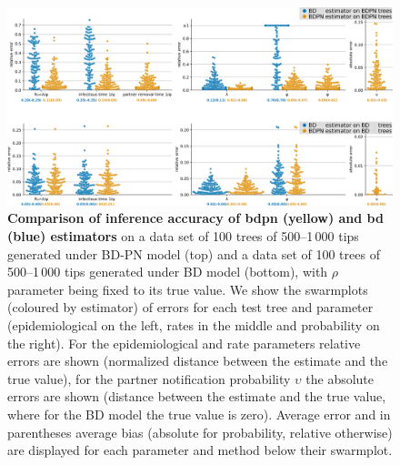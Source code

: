 \documentclass[10pt,letterpaper]{article}
\begin{document}
\begin{figure}[h!]
\begin{adjustwidth}{-1in}{0in}
\centering 
\includegraphics[width=1.2\textwidth]{Fig_errors_p.png}
\end{adjustwidth}
\caption{\textbf{Comparison of inference accuracy of bdpn (yellow) and bd (blue) estimators} on a data set of 100 trees of 500--1\,000 tips generated under BD-PN model (top) and a data set of 100 trees of 500--1\,000 tips generated under BD model (bottom), with $\rho$ parameter being fixed to its true value.
We show the swarmplots (coloured by estimator) of errors for each test tree and parameter (epidemiological on the left, rates in the middle and probability on the right). For the epidemiological and rate parameters relative errors are shown (normalized distance between the estimate and the true value), for the partner notification probability $\upsilon$ the absolute errors are shown (distance between the estimate and the true value, where for the BD model the true value is zero). Average error and in parentheses average bias (absolute for probability, relative otherwise) are displayed for each parameter and method below their swarmplot.} 
\label{fig:sim} 
\end{figure}
 
\end{document}
